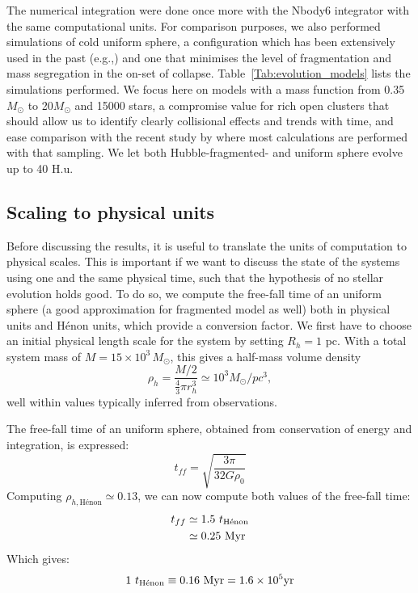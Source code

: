 The numerical integration were done once more with the Nbody6 integrator with the same computational units. For comparison purposes, we also performed simulations of cold uniform sphere, a configuration which has been extensively used  in the past (e.g.,\citealt{Theis1999,Boily2002,Barnes2009,Caputo2014,Benhaiem2015}) and one that minimises the level of fragmentation and mass segregation in the on-set of collapse. Table~\ref{Tab:evolution_models} lists the simulations performed. We focus here on models with a mass function from 0.35$M_\odot$ to 20$M_\odot$ and 15000 stars, a compromise value for rich open clusters that should allow us to identify clearly collisional effects and trends with time, and ease comparison with the recent study by \cite{Caputo2014} where most calculations are performed with that sampling. We let both Hubble-fragmented- and uniform sphere evolve up to 40 H.u. 





\subsection{Scaling to physical units}
\label{Sec:3_Scaling}
Before discussing the results, it is useful to translate the units of computation to physical scales. This is important if we want to discuss the state of the systems using one and the same physical time, such that the hypothesis of no stellar evolution holds good.
To do so, we compute the free-fall time of an uniform sphere (a good approximation for fragmented model as well) both in physical units and H\'enon units, which provide a conversion factor. We first have to choose an initial physical length scale for the system by setting $R_h = 1$ pc. With a total system mass of $M = 15\times 10^3\, M_\odot$, this gives a half-mass volume density 
\begin{equation}
\rho_h = \frac{M/2}{\frac{4}{3}\pi r_h^3}  \simeq 10^3 M_\odot / pc^3,
\end{equation}
well within values typically inferred from observations.

 The free-fall time of an uniform sphere, obtained from conservation of energy and integration, is expressed:
\begin{equation}
t_{ff} = \sqrt{\frac{3\pi}{32 G \rho_0}}
\end{equation}
Computing $\rho_{h,\textrm{H\'enon}} \simeq 0.13$, we can now compute both values of the free-fall time:
\begin{align}
t_{ff} &\simeq 1.5~ t_{\textrm{H\'enon}}\\
	   &\simeq 0.25~ {\textrm{Myr}}
\end{align}
Which gives: 
\begin{equation}
1 ~ t_{\textrm{H\'enon}} \equiv 0.16~ {\textrm{Myr}} = 1.6 \times 10^5 {\textrm{yr}} 
\end{equation}



